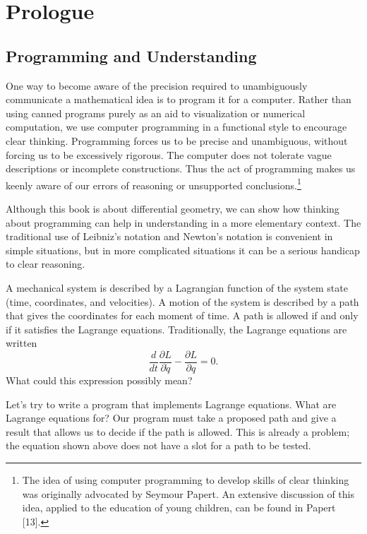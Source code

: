\documentclass[11pt]{article}
\author{Sam Ritchie}
\date{\today}
\title{}
\begin{document}
\tableofcontents


\section{Prologue}
\label{sec:org12af31c}

\subsection{Programming and Understanding}
\label{sec:orgd94f6e3}

One way to become aware of the precision required to unambiguously communicate a
mathematical idea is to program it for a computer. Rather than using canned
programs purely as an aid to visualization or numerical computation, we use
computer programming in a functional style to encourage clear thinking.
Programming forces us to be precise and unambiguous, without forcing us to be
excessively rigorous. The computer does not tolerate vague descriptions or
incomplete constructions. Thus the act of programming makes us keenly aware of
our errors of reasoning or unsupported conclusions.\footnote{The idea of using computer programming to develop skills of clear
thinking was originally advocated by Seymour Papert. An extensive discussion of
this idea, applied to the education of young children, can be found in Papert
[13].}

Although this book is about differential geometry, we can show how thinking
about programming can help in understanding in a more elementary context. The
traditional use of Leibniz’s notation and Newton’s notation is convenient in
simple situations, but in more complicated situations it can be a serious
handicap to clear reasoning.

A mechanical system is described by a Lagrangian function of the system state
(time, coordinates, and velocities). A motion of the system is described by a
path that gives the coordinates for each moment of time. A path is allowed if
and only if it satisfies the Lagrange equations. Traditionally, the Lagrange
equations are written $${\frac{d}{dt}\frac{\partial L}{\partial \dot{q}}} -
\frac{\partial L}{\partial q}=0.$$ What could this expression possibly mean?

Let’s try to write a program that implements Lagrange equations. What are
Lagrange equations for? Our program must take a proposed path and give a result
that allows us to decide if the path is allowed. This is already a problem; the
equation shown above does not have a slot for a path to be tested.
\end{document}
